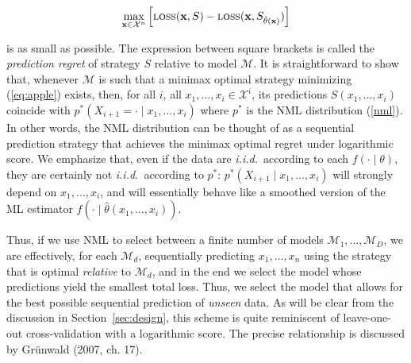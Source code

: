 \documentclass[authoryear]{elsarticle}
\newcommand{\loss}{\mbox{\sc loss}}
\newcommand{\model}{\mathcal{M}}
\newcommand{\sspace}[2]{\mathcal{#1}^{#2}}
\newcommand{\iid}{{\it i.i.d.}}
\newcommand{\vx}{\ensuremath{{\bf x}}}
\begin{document}
\vspace*{-12pt}
\begin{equation}
\label{eq:apple}
\max_{\vx \in {\sspace{X}{n}}} \left[ \loss(\vx,S) - \loss(\vx,S_{\hat{\theta}(\vx)}) \right]
\end{equation}

is as small as possible. The expression between square brackets is
called the {\em prediction regret\/} of strategy $S$ relative to model
$\model$. It is straightforward to show that, whenever $\model$ is such
that a minimax
optimal strategy minimizing (\ref{eq:apple}) exists, then, for all $i$, all
$x_1, \ldots, x_i \in {\sspace{X}{i}}$, its
predictions $S(x_1, \ldots, x_i)$ coincide with
$p^*(X_{i+1} = \cdot\mid x_1, \ldots, x_i)$ where $p^*$ is the NML
distribution (\ref{nml}). In other words, the NML distribution can be
thought of as a sequential prediction strategy that achieves the
minimax optimal regret under logarithmic score. We emphasize that,
even if the data are \iid\ according to each $f(\cdot \mid \theta)$,
they are certainly not \iid\ according to $p^*$: $p^*(X_{i+1} \mid
x_1, \ldots, x_i)$ will strongly depend on $x_1, \ldots, x_i$, and
will essentially behave like a smoothed version of the ML estimator
$f(\cdot \mid \hat{\theta}(x_1, \ldots, x_i))$.

Thus, if we use NML to select between a finite number of models
$\model_1, \ldots, \model_D$, we are effectively, for each $\model_d$,
sequentially predicting $x_1, \ldots, x_n$ using the strategy that is
optimal {\em relative\/} to $\model_d$, and in the end we select the
model whose predictions yield the smallest total loss. Thus, we select
the model that allows for the best possible sequential prediction of
{\em unseen\/} data. As will be clear from the discussion in
Section~\ref{sec:design}, this scheme is quite reminiscent of
leave-one-out cross-validation with a logarithmic score. The precise
relationship is discussed by Gr\"unwald (2007, ch. 17).
\end{document}
